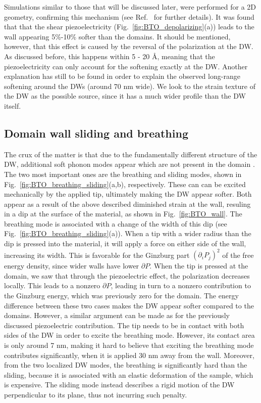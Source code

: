 Simulations similar to those that will be discussed later, were performed for a 2D geometry, confirming this mechanism (see Ref.~\cite{Stefani2020} for further details).
It was found that that the shear piezoelectricity (Fig.~\ref{fig:BTO_depolarizing}(a)) leads to the wall appearing 5\%-10\% softer than the domains.
It should be mentioned, however, that this effect is caused by the reversal of the polarization at the DW.
As discussed before, this happens within 5 - 20 \AA, meaning that the piezoelectricity can only account for the softening exactly at the DW.
Another explanation has still to be found in order to explain the observed long-range softening around the DWs (around 70 nm wide).
We look to the strain texture of the DW as the possible source, since it has a much wider profile than the DW itself.

\subsection{Domain wall sliding and breathing}
The crux of the matter is that due to the fundamentally different structure of the DW, additional soft phonon modes appear which are not present in the domain \cite{Chen2020}.
The two most important ones are the breathing and sliding modes, shown in Fig.~\ref{fig:BTO_breathing_sliding}(a,b), respectively.
These can can be excited mechanically by the applied tip, ultimately making the DW appear softer.
Both appear as a result of the above described diminished strain at the wall, resuling in a dip at the surface of the material, as shown in Fig.~\ref{fig:BTO_wall}.
The breathing mode is associated with a change of the width of this dip (see Fig.~\ref{fig:BTO_breathing_sliding}(a)).
When a tip with a wider radius than the dip is pressed into the material, it will apply a force on either side of the wall, increasing its width.
This is favorable for the Ginzburg part $(\partial_i P_j)^2$ of the free energy density, since wider walls have lower $\partial P$.
When the tip is pressed at the domain, we saw that through the piezoelectric effect, the polarization decreases locally.
This leads to a nonzero $\partial P$, leading in turn to a nonzero contribution to the Ginzburg energy, which was previously zero for the domain.
The energy difference between these two cases makes the DW appear softer compared to the domains.
However, a similar argument can be made as for the previously discussed piezoelectric contribution.
The tip needs to be in contact with both sides of the DW in order to excite the breathing mode.
However, its contact area is only around 7 nm, making it hard to believe that exciting the breathing mode contributes significantly, when it is applied 30 nm away from the wall.
Moreover, from the two localized DW modes, the breathing is significantly hard than the sliding, because it is associated with an elastic deformation of the sample, which is expensive.
The sliding mode instead describes a rigid motion of the DW perpendicular to its plane, thus not incurring such penalty. 

